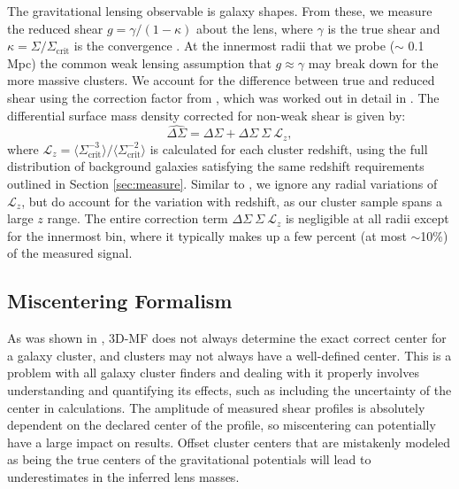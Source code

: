 The gravitational lensing observable is galaxy shapes. From these, we measure the reduced shear $g = \gamma / (1-\kappa)$ about the lens, where $\gamma$ is the true shear and $\kappa = \Sigma / \Sigma_{\mathrm{crit}}$ is the convergence \citep[as before, calculated using the \ac{NFW} halo formalism in][]{Wright00}. At the innermost radii that we probe ($\sim$ 0.1 Mpc) the common weak lensing assumption that $g \approx \gamma$ may break down for the more massive clusters. We account for the difference between true and reduced shear using the correction factor from \citet{Johnston07}, which was worked out in detail in \citet{Mandelbaum06}. The differential surface mass density corrected for non-weak shear is given by:
\begin{equation}
\widehat{\Delta\Sigma} = \Delta\Sigma + \Delta\Sigma \ \Sigma \ \mathcal{L}_z,
\end{equation}
where $\mathcal{L}_z = \langle \Sigma_{\mathrm{crit}}^{-3} \rangle / \langle \Sigma_{\mathrm{crit}}^{-2} \rangle$ is calculated for each cluster redshift, using the full distribution of background galaxies satisfying the same redshift requirements outlined in Section \ref{sec:measure}. Similar to \citet{Leauthaud10}, we ignore any radial variations of $\mathcal{L}_z$, but do account for the variation with redshift, as our cluster sample spans a large $z$ range. The entire correction term $\Delta\Sigma \ \Sigma \ \mathcal{L}_z$ is negligible at all radii except for the innermost bin, where it typically makes up a few percent (at most $\sim$10\%) of the measured signal.


\subsection{Miscentering Formalism}
\label{sec:miscentering}

As was shown in \citet{Milkeraitis10}, \ac{3D-MF} does not always determine the exact correct center for a galaxy cluster, and clusters may not always have a well-defined center. This is a problem with all galaxy cluster finders and dealing with it properly involves understanding and quantifying its effects, such as including the uncertainty of the center in calculations. The amplitude of measured shear profiles is absolutely dependent on the declared center of the profile, so miscentering can potentially have a large impact on results. Offset cluster centers that are mistakenly modeled as being the true centers of the gravitational potentials will lead to underestimates in the inferred lens masses.


